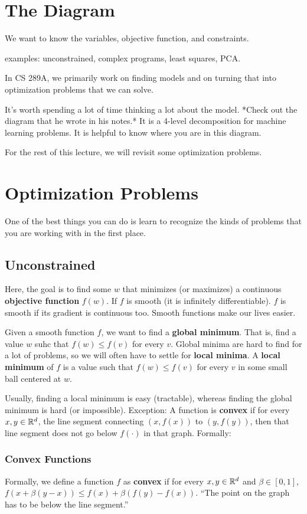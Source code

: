 \section{The Diagram}
We want to know the variables, objective function, and constraints.

examples: unconstrained, complex programs, least squares, PCA.

In CS 289A, we primarily work on finding models and on turning that into optimization problems that we can solve.

It's worth spending a lot of time thinking a lot about the model.
*Check out the diagram that he wrote in his notes.*
It is a 4-level decomposition for machine learning problems.
It is helpful to know where you are in this diagram.

For the rest of this lecture, we will revisit some optimization problems.

\section{Optimization Problems}
One of the best things you can do is learn to recognize the kinds of problems that you are working with in the first place.

\subsection{Unconstrained}
Here, the goal is to find some $w$ that minimizes (or maximizes) a continuous \textbf{objective function} $f(w)$.
If $f$ is smooth (it is infinitely differentiable).
$f$ is smooth if its gradient is continuous too.
Smooth functions make our lives easier.

Given a smooth function $f$, we want to find a \textbf{global minimum}.
That is, find a value $w$ suhc that $f(w) \leq f(v)$ for every $v$.
Global minima are hard to find for a lot of problems, so we will often have to settle for \textbf{local minima}.
A \textbf{local minimum} of $f$ is a value such that $f(w) \leq f(v)$ for every $v$ in some small ball centered at $w$.

Usually, finding a local minimum is easy (tractable), whereas finding the global minimum is hard (or impossible).
Exception: A function is \textbf{convex} if for every $x, y \in \mathbb R^d$, the line segment connecting $(x, f(x))$ to $(y, f(y))$, then that line segment does not go below $f(\cdot)$ in that graph.
Formally: 

\subsubsection{Convex Functions}
Formally, we define a function $f$ as \textbf{convex} if for every $x, y \in \mathbb R^d$ and $\beta \in [0, 1]$, $f(x + \beta(y - x)) \leq f(x) + \beta(f(y) - f(x))$.
``The point on the graph has to be below the line segment.''

